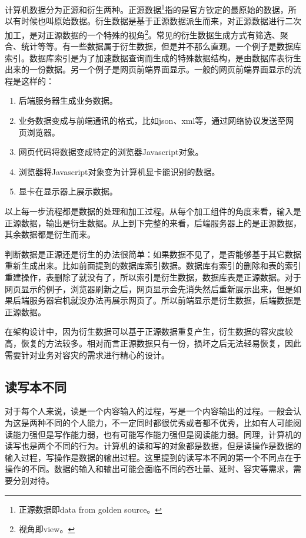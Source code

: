 计算机数据分为正源和衍生两种。正源数据\footnote{正源数据即data from golden source。}指的是官方钦定的最原始的数据，所以有时候也叫原始数据。衍生数据是基于正源数据派生而来，对正源数据进行二次加工，是对正源数据的一个特殊的视角\footnote{视角即view。}。常见的衍生数据生成方式有筛选、聚合、统计等等。有一些数据属于衍生数据，但是并不那么直观。一个例子是数据库索引。数据库索引是为了加速数据查询而生成的特殊数据结构，是由数据库表衍生出来的一份数据。另一个例子是网页前端界面显示。一般的网页前端界面显示的流程是这样的：
\begin{enumerate}
    \item 后端服务器生成业务数据。 
    \item 业务数据变成与前端通讯的格式，比如json、xml等，通过网络协议发送至网页浏览器。
    \item 网页代码将数据变成特定的浏览器Javascript对象。
    \item 浏览器将Javascript对象变为计算机显卡能识别的数据。
    \item 显卡在显示器上展示数据。
\end{enumerate}

以上每一步流程都是数据的处理和加工过程。从每个加工组件的角度来看，输入是正源数据，输出是衍生数据。从上到下完整的来看，后端服务器上的是正源数据，其余数据都是衍生而来。


判断数据是正源还是衍生的办法很简单：如果数据不见了，是否能够基于其它数据重新生成出来。比如前面提到的数据库索引数据。数据库有索引的删除和表的索引重建操作，表删除了就没有了，所以索引是衍生数据，数据库表是正源数据。对于网页显示的例子，浏览器刷新之后，网页显示会先消失然后重新展示出来，但是如果后端服务器宕机就没办法再展示网页了。所以前端显示是衍生数据，后端数据是正源数据。


在架构设计中，因为衍生数据可以基于正源数据重复产生，衍生数据的容灾度较高，恢复的方法较多。相对而言正源数据只有一份，损坏之后无法轻易恢复，因此需要针对业务对容灾的需求进行精心的设计。


\subsection{读写本不同}

对于每个人来说，读是一个内容输入的过程，写是一个内容输出的过程。一般会认为这是两种不同的个人能力，不一定同时都很优秀或者都不优秀，比如有人可能阅读能力强但是写作能力弱，也有可能写作能力强但是阅读能力弱。同理，计算机的读写也是两个不同的行为。计算机的读和写的对象都是数据，但是读操作是数据的输入过程，写操作是数据的输出过程。这里提到的读写本不同的第一个不同点在于操作的不同。数据的输入和输出可能会面临不同的吞吐量、延时、容灾等需求，需要分别对待。


